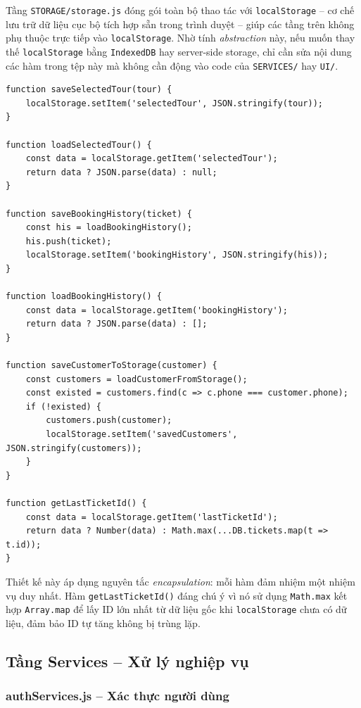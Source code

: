 \documentclass[12pt,a4paper]{article}
\begin{document}
Tầng \texttt{STORAGE/storage.js} đóng gói toàn bộ thao tác với \texttt{localStorage} -- cơ chế lưu trữ dữ liệu cục bộ tích hợp sẵn trong trình duyệt -- giúp các tầng trên không phụ thuộc trực tiếp vào \texttt{localStorage}. Nhờ tính \textit{abstraction} này, nếu muốn thay thế \texttt{localStorage} bằng \texttt{IndexedDB} hay server-side storage, chỉ cần sửa nội dung các hàm trong tệp này mà không cần động vào code của \texttt{SERVICES/} hay \texttt{UI/}.

\begin{lstlisting}[caption={storage.js -- Các hàm quản lý localStorage}]
function saveSelectedTour(tour) {
    localStorage.setItem('selectedTour', JSON.stringify(tour));
}

function loadSelectedTour() {
    const data = localStorage.getItem('selectedTour');
    return data ? JSON.parse(data) : null;
}

function saveBookingHistory(ticket) {
    const his = loadBookingHistory();
    his.push(ticket);
    localStorage.setItem('bookingHistory', JSON.stringify(his));
}

function loadBookingHistory() {
    const data = localStorage.getItem('bookingHistory');
    return data ? JSON.parse(data) : [];
}

function saveCustomerToStorage(customer) {
    const customers = loadCustomerFromStorage();
    const existed = customers.find(c => c.phone === customer.phone);
    if (!existed) {
        customers.push(customer);
        localStorage.setItem('savedCustomers', JSON.stringify(customers));
    }
}

function getLastTicketId() {
    const data = localStorage.getItem('lastTicketId');
    return data ? Number(data) : Math.max(...DB.tickets.map(t => t.id));
}
\end{lstlisting}

Thiết kế này áp dụng nguyên tắc \textit{encapsulation}: mỗi hàm đảm nhiệm một nhiệm vụ duy nhất. Hàm \texttt{getLastTicketId()} đáng chú ý vì nó sử dụng \texttt{Math.max} kết hợp \texttt{Array.map} để lấy ID lớn nhất từ dữ liệu gốc khi \texttt{localStorage} chưa có dữ liệu, đảm bảo ID tự tăng không bị trùng lặp.

\subsection{Tầng Services -- Xử lý nghiệp vụ}

\subsubsection{authServices.js -- Xác thực người dùng}
\end{document}
